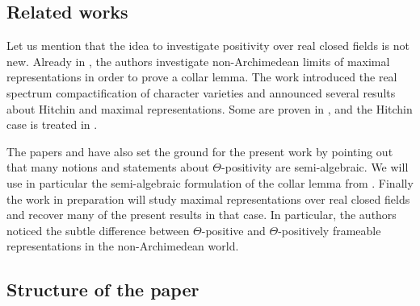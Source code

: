 \documentclass{amsart}
\theoremstyle{plain}
\theoremstyle{definition}
\newcommand{\1}{\mathbf{1}}
\begin{document}
\subsection{Related works}

Let us mention that the idea to investigate positivity over real closed fields is not new. Already in \cite{BurgerPozzetti}, the authors investigate non-Archimedean limits of maximal representations in order to prove a collar lemma. The work \cite{ BurgerIozziParreauPozzetti_RSCCharacterVarieties1} introduced the real spectrum compactification of character varieties and announced several results about Hitchin and maximal representations. Some are proven in \cite{BurgerIozziParreauPozzetti_RSCCharacterVarieties2}, and the Hitchin case is treated in \cite{Flamm}.

The papers and \cite{guichard2025generalizing,GLW,BeyrerGuichardLabouriePozzettiWienhard_PositivityCrossRatiosCollarLemma} have also set the ground for the present work by pointing out that many notions and statements about $\Theta$-positivity are semi-algebraic. We will use in particular the semi-algebraic formulation of the collar lemma from \cite{BeyrerGuichardLabouriePozzettiWienhard_PositivityCrossRatiosCollarLemma}. Finally the work in preparation \cite{BIPP_RSCMaximalRepr} will study maximal representations over real closed fields and recover many of the present results in that case. In particular, the authors noticed the subtle difference between $\Theta$-positive and $\Theta$-positively frameable representations in the non-Archimedean world.

\subsection{Structure of the paper}
\end{document}
